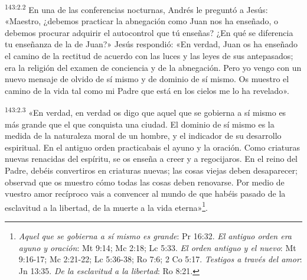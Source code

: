 \par
\textsuperscript{143:2.2} En una de las conferencias nocturnas, Andrés le preguntó a Jesús: «Maestro, ¿debemos practicar la abnegación como Juan nos ha enseñado, o debemos procurar adquirir el autocontrol que tú enseñas? ¿En qué se diferencia tu enseñanza de la de Juan?» Jesús respondió: «En verdad, Juan os ha enseñado el camino de la rectitud de acuerdo con las luces y las leyes de sus antepasados; era la religión del examen de conciencia y de la abnegación. Pero yo vengo con un nuevo mensaje de olvido de sí mismo y de dominio de sí mismo. Os muestro el camino de la vida tal como mi Padre que está en los cielos me lo ha revelado».

\par
\textsuperscript{143:2.3} «En verdad, en verdad os digo que aquel que se gobierna a sí mismo es más grande que el que conquista una ciudad. El dominio de sí mismo es la medida de la naturaleza moral de un hombre, y el indicador de su desarrollo espiritual. En el antiguo orden practicabais el ayuno y la oración. Como criaturas nuevas renacidas del espíritu, se os enseña a creer y a regocijaros. En el reino del Padre, debéis convertiros en criaturas nuevas; las cosas viejas deben desaparecer; observad que os muestro cómo todas las cosas deben renovarse. Por medio de vuestro amor recíproco vais a convencer al mundo de que habéis pasado de la esclavitud a la libertad, de la muerte a la vida eterna»\footnote{\textit{Aquel que se gobierna a sí mismo es grande}: Pr 16:32. \textit{El antiguo orden era ayuno y oración}: Mt 9:14; Mc 2:18; Lc 5:33. \textit{El orden antiguo y el nuevo}: Mt 9:16-17; Mc 2:21-22; Lc 5:36-38; Ro 7:6; 2 Co 5:17. \textit{Testigos a través del amor}: Jn 13:35. \textit{De la esclavitud a la libertad}: Ro 8:21.}.

